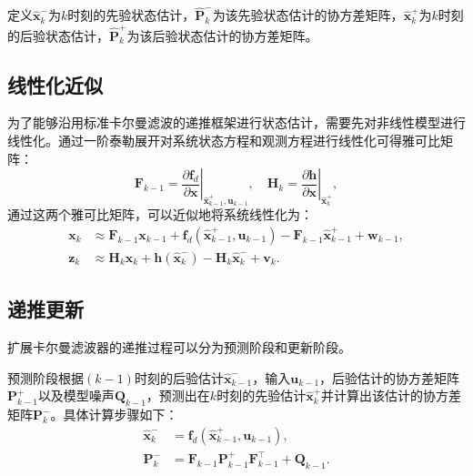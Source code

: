 定义$\hat{\bm{x}}_{k}^-$为$k$时刻的先验状态估计，$\hat{\bm{P}}_{k}^-$为该先验状态估计的协方差矩阵，$\hat{\bm{x}}_{k}^+$为$k$时刻的后验状态估计，$\hat{\bm{P}}_{k}^+$为该后验状态估计的协方差矩阵。

\subsection{线性化近似}
为了能够沿用标准卡尔曼滤波的递推框架进行状态估计，需要先对非线性模型进行线性化。通过一阶泰勒展开对系统状态方程和观测方程进行线性化可得雅可比矩阵：
\begin{equation}
    \bm{F}_{k-1} = \left. \frac{\partial \bm{f}_d}{\partial \bm{x}} \right|_{\hat{\bm{x}}_{k-1}^+, \bm{u}_{k-1}}, \quad \bm{H}_{k} = \left. \frac{\partial \bm{h}}{\partial \bm{x}} \right|_{\hat{\bm{x}}_{k}^+},
\end{equation}
通过这两个雅可比矩阵，可以近似地将系统线性化为：
\begin{equation}
    \begin{aligned}
    \bm{x}_{k} &\approx \bm{F}_{k-1} \bm{x}_{k-1} + \bm{f}_d(\hat{\bm{x}}_{k-1}^{+}, \bm{u}_{k-1}) - \bm{F}_{k-1} \hat{\bm{x}}_{k-1}^{+} + \bm{w}_{k-1}, \\
    \bm{z}_{k} &\approx \bm{H}_{k} \bm{x}_{k} + \bm{h}(\hat{\bm{x}}_{k}^{-}) - \bm{H}_{k} \hat{\bm{x}}_{k}^{-} + \bm{v}_{k}.
    \end{aligned}
\end{equation}

\subsection{递推更新}
扩展卡尔曼滤波器的递推过程可以分为预测阶段和更新阶段。

预测阶段根据$(k-1)$时刻的后验估计$\hat{\bm{x}}_{k-1}^-$，输入$\bm{u}_{k-1}$，后验估计的协方差矩阵$\bm{P}_{k-1}^{+}$以及模型噪声$\bm{Q}_{k-1}$，预测出在$k$时刻的先验估计$\hat{\bm{x}}_{k}^+$并计算出该估计的协方差矩阵$\bm{P}_{k}^{-}$。具体计算步骤如下：
\begin{equation}
    \begin{aligned}
    \hat{\bm{x}}_{k}^{-} &= \bm{f}_d(\hat{\bm{x}}_{k-1}^{+}, \bm{u}_{k-1}), \\
    \bm{P}_{k}^{-} &= \bm{F}_{k-1} \bm{P}_{k-1}^{+} \bm{F}_{k-1}^{\top} + \bm{Q}_{k-1}.
    \end{aligned}
\end{equation}

